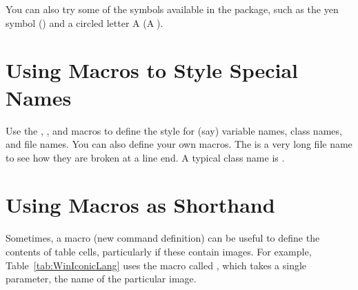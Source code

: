 You can also try some of the  symbols available
in the  package, such as the yen symbol (\textyen) and
a circled letter A (\textcircled{A}).



\section{Using Macros to Style Special Names}

Use the , , and  macros to
define the style for (say) variable names, class names, and file
names. You can also define your own macros. The is a very long file
name  to see how they
are broken at a line end. A typical class name is
.





\section{Using Macros as Shorthand}

Sometimes, a macro (new command definition) can be useful to define
the contents of table cells, particularly if these contain images. For
example, Table~\ref{tab:WinIconicLang} uses the macro called
, which takes a single parameter, the name of
the particular image.


